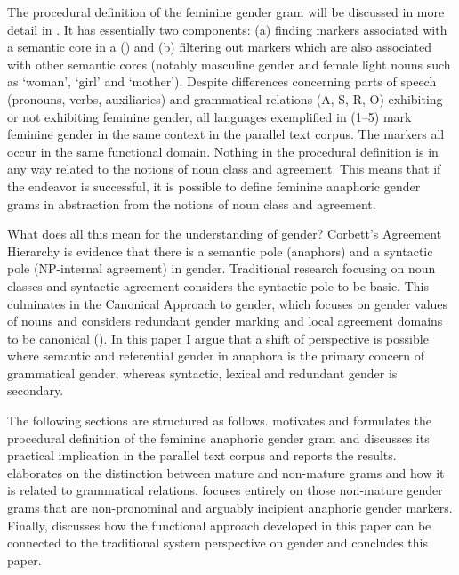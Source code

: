 \documentclass[output=collectionpaper]{langsci/langscibook}
\begin{document}
The procedural definition of the feminine gender gram will be discussed in more detail in . It has essentially two components: (a) finding markers associated with a semantic core in a  (\citealt{Givon1981}) and (b) filtering out markers which are also associated with other semantic cores (notably masculine gender and female light nouns such as ‘woman’, ‘girl’ and ‘mother’). Despite differences concerning parts of speech (pronouns, verbs, auxiliaries) and grammatical relations (A, S, R, O) exhibiting or not exhibiting feminine gender, all languages exemplified in (1--5) mark feminine gender in the same context in the parallel text corpus. The markers all occur in the same functional domain. Nothing in the procedural definition is in any way related to the notions of noun class and agreement. This means that if the endeavor is successful, it is possible to define feminine anaphoric gender grams in abstraction from the notions of noun class and agreement.

What does all this mean for the understanding of gender? Corbett’s Agreement Hierarchy is evidence that there is a semantic pole (anaphors) and a syntactic pole (NP-internal agreement) in gender. Traditional research focusing on noun classes and syntactic agreement considers the syntactic pole to be basic. This culminates in the Canonical Approach to gender, which focuses on gender values of nouns and considers redundant gender marking and local agreement domains to be canonical (\citealt{Corbett2016}). In this paper I argue that a shift of perspective is possible where semantic and referential gender in anaphora is the primary concern of grammatical gender, whereas syntactic, lexical and redundant gender is secondary.

The following sections are structured as follows.  motivates and formulates the procedural definition of the feminine anaphoric gender gram and  discusses its practical implication in the parallel text corpus and reports the results.  elaborates on the distinction between mature and non-mature grams and how it is related to grammatical relations.  focuses entirely on those non-mature gender grams that are non-pronominal and arguably incipient anaphoric gender markers. Finally,  discusses how the functional approach developed in this paper can be connected to the traditional system perspective on gender and  concludes this paper.
\end{document}
